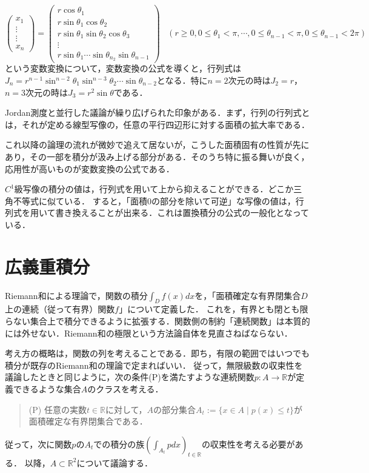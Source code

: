 \documentclass[uplatex, dvipdfmx]{jsreport}
\begin{document}
\begin{example*}[$n$次元Euclid空間の極座標変換]
    \[ \begin{pmatrix}x_1\\\vdots\\\vdots\\x_n\end{pmatrix} = \begin{pmatrix}r\cos\theta_1\\r\sin\theta_1\cos\theta_2\\r\sin\theta_1\sin\theta_2\cos\theta_3\\\vdots\\r\sin\theta_1\cdots\sin\theta_{n_2}\sin\theta_{n-1}\end{pmatrix} \;\;\; (r\ge 0,0\le\theta_1<\pi,\cdots,0\le\theta_{n-1}<\pi,0\le\theta_{n-1}<2\pi) \]
    という変数変換について，変数変換の公式を導くと，行列式は$J_n=r^{n-1}\sin^{n-2}\theta_1\sin^{n-3}\theta_2\cdots\sin\theta_{n-2}$となる．特に$n=2$次元の時は$J_2=r$，$n=3$次元の時は$J_3=r^2\sin\theta$である．
\end{example*}

\begin{screen}
    Jordan測度と並行した議論が繰り広げられた印象がある．まず，行列の行列式とは，それが定める線型写像の，任意の平行四辺形に対する面積の拡大率である．

    これ以降の論理の流れが微妙で追えて居ないが，こうした面積固有の性質が先にあり，その一部を積分が汲み上げる部分がある．そのうち特に振る舞いが良く，応用性が高いものが変数変換の公式である．

    $C^1$級写像の積分の値は，行列式を用いて上から抑えることができる．どこか三角不等式に似ている．
    すると，「面積$0$の部分を除いて可逆」な写像の値は，行列式を用いて書き換えることが出来る．これは置換積分の公式の一般化となっている．
\end{screen}

\section{広義重積分}
Riemann和による理論で，関数の積分$\int_Df(x)dx$を，「面積確定な有界閉集合$D$上の連続（従って有界）関数$f$」について定義した．
これを，有界とも閉とも限らない集合上で積分できるように拡張する．関数側の制約「連続関数」は本質的には外せない．Riemann和の極限という方法論自体を見直さねばならない．

考え方の概略は，関数の列を考えることである．即ち，有限の範囲ではいつでも積分が既存のRiemann和の理論で定まればいい．
従って，無限級数の収束性を議論したときと同じように，次の条件(P)を満たすような連続関数$p:A\to\mathbb{R}$が定義できるような集合$A$のクラスを考える．
\begin{quote}
    (P) 任意の実数$t\in\mathbb{R}$に対して，$A$の部分集合$A_t:=\{x\in A\mid p(x)\le t\}$が面積確定な有界閉集合である．
\end{quote}
従って，次に関数$p$の$A_t$での積分の族$\left(\int_{A_t}pdx\right)_{t\in\mathbb{R}}$の収束性を考える必要がある．
以降，$A\subset\mathbb{R}^2$について議論する．
\end{document}
